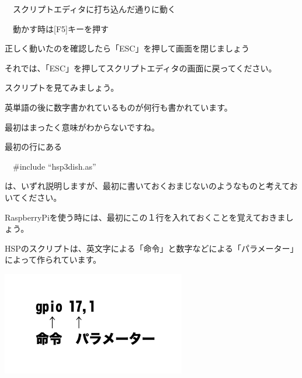 \documentclass[a4paper,dvipdfmx]{jarticle}
\begin{document}
\bigskip

\ \ スクリプトエディタに打ち込んだ通りに動く

\ \ 動かす時は[F5]キーを押す

正しく動いたのを確認したら「ESC」を押して画面を閉じましょう


\bigskip

それでは、「ESC」を押してスクリプトエディタの画面に戻ってください。

スクリプトを見てみましょう。

英単語の後に数字書かれているものが何行も書かれています。

最初はまったく意味がわからないですね。


\bigskip


\bigskip


\bigskip

最初の行にある


\bigskip

\ \ \#include “hsp3dish.as”


\bigskip

は、いずれ説明しますが、最初に書いておくおまじないのようなものと考えておいてください。

RaspberryPiを使う時には、最初にこの１行を入れておくことを覚えておきましょう。


\bigskip

HSPのスクリプトは、英文字による「命令」と数字などによる「パラメーター」によって作られています。



\begin{center}
\includegraphics[width=8.017cm,height=4.512cm]{text02-img/text02-img024.png}

\end{center}

\bigskip


\bigskip


\bigskip


\bigskip


\bigskip


\bigskip
\end{document}
